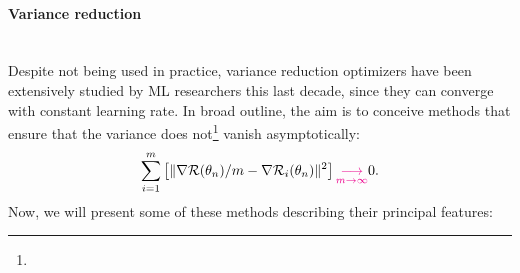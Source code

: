 \paragraph{Variance reduction}  
~~\\
Despite not being used in practice, variance reduction optimizers have been extensively studied by ML researchers this last decade, since they can converge with constant learning
rate. In broad outline, the aim is to conceive methods that ensure that the variance does not\footnote{} vanish asymptotically:
\begin{equation*}
  \displaystyle{\sum_{i=1}^m}\left[\|\nabla \mathcal{R}(\theta_n)/m-\nabla \mathcal{R}_i(\theta_n)\|^2\right] \textcolor{magenta}{\underset{m\to \infty}{\longrightarrow}} 0.
\end{equation*}
Now, we will present some of these methods describing their principal features:
